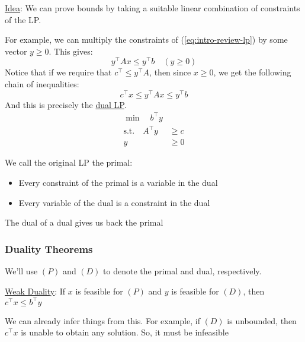 \underline{Idea}: We can prove bounds by taking a suitable linear combination of constraints of the LP.

For example, we can multiply the constraints of (\ref{eq:intro-review-lp}) by some vector $y \geq 0$. This gives:
\begin{equation*}
    y^\intercal Ax \leq y^\intercal b \quad (y \geq 0)
\end{equation*}
Notice that if we require that $c^\intercal \leq y^\intercal A$, then since $x \geq 0$, we get the following chain of inequalities:
\begin{equation*}
    c^\intercal x \leq y^\intercal Ax \leq y^\intercal b 
\end{equation*}
And this is precisely the \underline{dual LP}.
\begin{equation}\label{eq:intro-review-lp-dual}\tag{D}
\begin{aligned}
    \min \quad b^\intercal y & \\
    \text{s.t.} \quad A^\intercal y &\geq c \\
    y &\geq 0
\end{aligned}
\end{equation}

We call the original LP the primal:
\begin{itemize}
    \item Every constraint of the primal is a variable in the dual
    \item Every variable of the dual is a constraint in the dual
\end{itemize}

\begin{remark}{}{}
    The dual of a dual gives us back the primal
\end{remark}

\subsubsection{Duality Theorems}
We'll use $(P)$ and $(D)$ to denote the primal and dual, respectively.

\underline{Weak Duality}:
If $x$ is feasible for $(P)$ and $y$ is feasible for $(D)$, then $c^\intercal x \leq b^\intercal y$

\begin{note}
    We can already infer things from this. For example, if $(D)$ is unbounded, then $c^\intercal x$ is unable to obtain any solution. So, it must be infeasible
\end{note}


